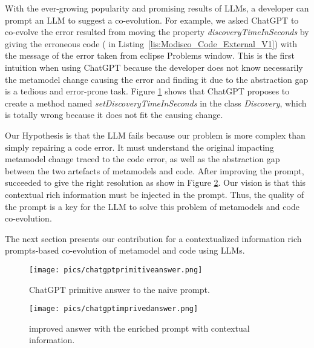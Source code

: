 With the ever-growing popularity and promising results of LLMs, a developer can prompt an LLM to suggest a co-evolution. 
For example, 
we asked ChatGPT to co-evolve the error resulted from moving the property \emph{discoveryTimeInSeconds} by giving the erroneous code ({\small{}} in Listing~\ref{lis:Modisco_Code_External_V1})  with the message of the error taken from eclipse Problems window. This is the first intuition when using ChatGPT because the developer does not know necessarily the metamodel change causing the error and finding it due to the abstraction gap is a tedious and error-prone task. Figure \ref{fig: chatgptanswer} shows that ChatGPT proposes to create a method named \emph{setDiscoveryTimeInSeconds} in the class \emph{Discovery}, which is totally wrong because it does not fit the causing change. 

Our Hypothesis is that the LLM fails because our problem is more complex than simply repairing a code error. It must understand the original impacting metamodel change traced to the code error, as well as the abstraction gap between the two artefacts of metamodels and code. After improving the prompt, \LLM succeeded to give the right resolution as show in Figure \ref{fig: chatgptimprovedanswer}.
Our vision is that this contextual rich information must be injected in the prompt.
Thus, the quality of the prompt is a key for the LLM to solve this problem of metamodels and code co-evolution. %

%
The next section presents our contribution for a contextualized information rich prompts-based co-evolution of metamodel and code using LLMs.  


\begin{figure}[t]
\centering
\texttt{[image: pics/chatgptprimitiveanswer.png]}
\caption{ChatGPT primitive answer to the naive prompt.}
\label{fig: chatgptanswer}
\end{figure}

\begin{figure}[t]
\centering
\texttt{[image: pics/chatgptimprivedanswer.png]}
\caption{\LLM improved answer with the enriched prompt with contextual information.}
\label{fig: chatgptimprovedanswer}
\vspace{-5mm}
\end{figure}